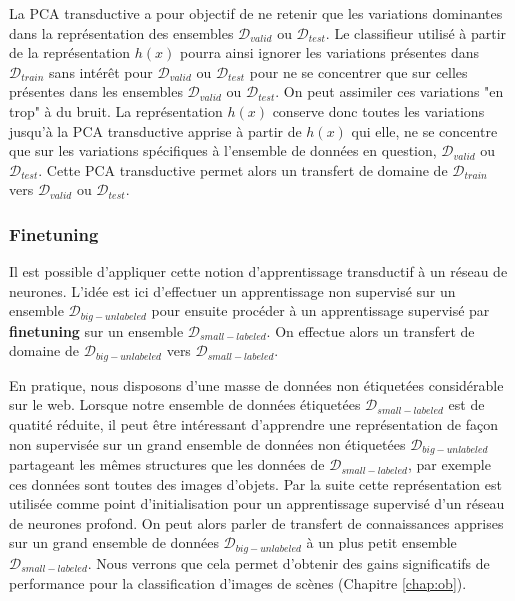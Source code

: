 La PCA transductive a pour objectif de ne retenir que les variations dominantes
dans la représentation des ensembles $\mathcal{D}_{valid}$ ou
$\mathcal{D}_{test}$. Le classifieur utilisé à partir de la représentation
$h(x)$ pourra ainsi ignorer les variations présentes dans $\mathcal{D}_{train}$
sans intérêt pour $\mathcal{D}_{valid}$ ou $\mathcal{D}_{test}$ pour ne se
concentrer que sur celles présentes dans les ensembles $\mathcal{D}_{valid}$ ou
$\mathcal{D}_{test}$. On peut assimiler ces variations "en trop" à du bruit. La
représentation $h(x)$ conserve donc toutes les variations jusqu'à la PCA
transductive apprise à partir de $h(x)$ qui elle, ne se concentre que sur les
variations spécifiques à l'ensemble de données en question,
$\mathcal{D}_{valid}$ ou $\mathcal{D}_{test}$. Cette PCA transductive permet
alors un transfert de domaine de $\mathcal{D}_{train}$ vers
$\mathcal{D}_{valid}$ ou $\mathcal{D}_{test}$. 

\subsubsection{Finetuning}

Il est possible d'appliquer cette notion d'apprentissage transductif à un
réseau de neurones. L'idée est ici d'effectuer un apprentissage non supervisé
sur un ensemble $\mathcal{D}_{big-unlabeled}$ pour ensuite procéder à un
apprentissage supervisé par {\bf finetuning} sur un ensemble
$\mathcal{D}_{small-labeled}$. On effectue alors un transfert de domaine de
$\mathcal{D}_{big-unlabeled}$ vers $\mathcal{D}_{small-labeled}$.

En pratique, nous disposons d'une masse de données non étiquetées considérable sur le web.
Lorsque notre ensemble de données étiquetées $\mathcal{D}_{small-labeled}$ est de
quatité réduite, il peut être intéressant d'apprendre une représentation de façon non
supervisée sur un grand ensemble de données non étiquetées
$\mathcal{D}_{big-unlabeled}$ partageant les mêmes structures que les données
de $\mathcal{D}_{small-labeled}$, par exemple ces données sont toutes des
images d'objets. Par la suite cette représentation est utilisée comme point
d'initialisation pour un apprentissage supervisé d'un réseau de neurones
profond. On peut alors parler de transfert de connaissances apprises sur un
grand ensemble de données $\mathcal{D}_{big-unlabeled}$ à un plus petit
ensemble $\mathcal{D}_{small-labeled}$.  Nous verrons que cela permet d'obtenir
des gains significatifs de performance pour la classification d'images de
scènes (Chapitre \ref{chap:ob}).

